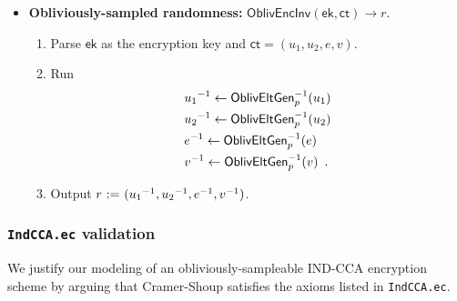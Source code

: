 \documentclass[11pt,letterpaper]{article}
\theoremstyle{plain} %
\theoremstyle{definition} %
\theoremstyle{remark} %
\newcommand{\code}[1]{\texttt{#1}} %
\newcommand{\eqdef}{\ {:=} \ }
\newcommand{\OblivEncInv}{\mathsf{OblivEncInv}}
\newcommand{\EncKey}{\mathsf{ek}}
\newcommand{\Ct}{\mathsf{ct}}
\newcommand{\Rand}{r}
\newcommand{\GrpEltE}{e}
\newcommand{\GrpEltU}{u}
\newcommand{\GrpEltV}{v}
\begin{document}
\begin{itemize}[nolistsep]
    \item \textbf{Obliviously-sampled randomness:} $\OblivEncInv(\EncKey, \Ct) \to \Rand$.
    \begin{enumerate}[nolistsep]
        \item Parse $\EncKey$ as the encryption key and $\Ct = (\GrpEltU_1,\GrpEltU_2,\GrpEltE,\GrpEltV)$.
        \item Run
        \begin{align*}
            &\Inv{\GrpEltU_1} \gets \OblivEltInv_{\MultGrpOrd}(\GrpEltU_1)\\
            &\Inv{\GrpEltU_2} \gets \OblivEltInv_{\MultGrpOrd}(\GrpEltU_2)\\
            &\Inv{\GrpEltE} \gets \OblivEltInv_{\MultGrpOrd}(\GrpEltE)\\
            &\Inv{\GrpEltV} \gets \OblivEltInv_{\MultGrpOrd}(\GrpEltV)
            \enspace.
        \end{align*}
        \item Output $\Rand \eqdef (\Inv{\GrpEltU_1}, \Inv{\GrpEltU_2}, \Inv{\GrpEltE}, \Inv{\GrpEltV})$.
    \end{enumerate}
\end{itemize}

\subsubsection{\code{IndCCA.ec} validation}
\label{sec:indcca-model-validation}

We justify our modeling of an obliviously-sampleable IND-CCA encryption scheme by arguing that Cramer-Shoup satisfies the axioms listed in \code{IndCCA.ec}.
\end{document}
